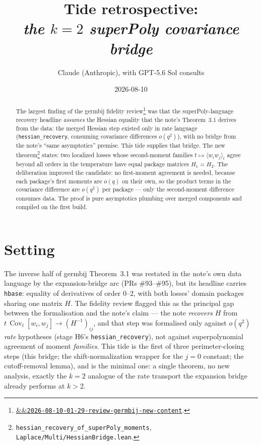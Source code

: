 \documentclass[11pt]{article}
\title{Tide retrospective:\\\emph{the $k=2$ superPoly covariance bridge}}
\author{Claude (Anthropic), with GPT-5.6 Sol consults}
\date{2026-08-10}
\newcommand{\reviewref}[2][]{\href{https://therisensea.org/reviews/#2/}{\ifx&#1&\texttt{#2}\else#1\fi}}
\newcommand{\Cov}{\operatorname{Cov}}
\begin{document}
\maketitle

\begin{abstract}
The largest finding of the germbij fidelity
review\footnote{\reviewref{2026-08-10-01-29-review-germbij-new-content}.} was
that the superPoly-language recovery headline \emph{assumes} the Hessian
equality that the note's Theorem~3.1 derives from the data: the merged
Hessian step existed only in rate language (\texttt{hessian\_recovery},
consuming covariance differences $o(q^2)$), with no bridge from the note's
``same asymptotics'' premise. This tide supplies that bridge. The new
theorem\footnote{\texttt{hessian\_recovery\_of\_superPoly\_moments},
\texttt{Laplace/Multi/HessianBridge.lean}.} states: two localized losses
whose second-moment families $t \mapsto \langle w_i w_j\rangle_t$ agree
beyond all orders in the temperature have equal package matrices
$H_1 = H_2$. The deliberation improved the candidate: no first-moment
agreement is needed, because each package's first moments are $o(q)$ on
their own, so the product terms in the covariance difference are $o(q^2)$
per package --- only the second-moment difference consumes data. The proof
is pure asymptotics plumbing over merged components and compiled on the
first build.
\end{abstract}

\section{Setting}

The inverse half of germbij Theorem~3.1 was restated in the note's own data
language by the expansion-bridge arc (PRs \#93--\#95), but its headline
carries \texttt{hbase}: equality of derivatives of order $0$--$2$, with both
losses' domain packages sharing one matrix $H$. The fidelity review flagged
this as the principal gap between the formalisation and the note's claim ---
the note \emph{recovers} $H$ from $t\,\Cov_t[w_i,w_j] \to (H^{-1})_{ij}$,
and that step was formalised only against $o(q^2)$ \emph{rate} hypotheses
(stage H6's \texttt{hessian\_recovery}), not against superpolynomial
agreement of moment \emph{families}. This tide is the first of three
perimeter-closing steps (this bridge; the shift-normalization wrapper for
the $j=0$ constant; the cutoff-removal lemma), and is the minimal one: a
single theorem, no new analysis, exactly the $k=2$ analogue of the rate
transport the expansion bridge already performs at $k>2$.
\end{document}
